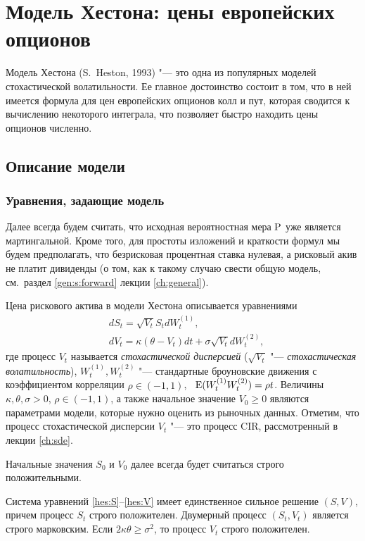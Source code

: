 
\chapter{Модель Хестона: цены европейских опционов}
\label{ch:heston-formula}
\chaptertoc

Модель Хестона (S.~Heston, 1993) "--- это одна из популярных моделей стохастической волатильности.
Ее главное достоинство состоит в том, что в ней имеется формула для цен европейских опционов колл и пут, которая сводится к вычислению некоторого интеграла, что позволяет быстро находить цены опционов численно.

\section{Описание модели}
\subsection{Уравнения, задающие модель}

Далее всегда будем считать, что исходная вероятностная мера $\P$ уже является мартингальной.
Кроме того, для простоты изложений и краткости формул мы будем предполагать, что безрисковая процентная ставка нулевая, а рисковый акив не платит дивиденды (о том, как к такому случаю свести общую модель, см.~раздел \ref{gen:s:forward} лекции \ref{ch:general}).

Цена рискового актива в модели Хестона описывается уравнениями
\begin{align}
\label{hes:S}
&dS_t = \sqrt{V_t}S_t d W_t^{(1)},\\
\label{hes:V}
&d V_t = \kappa(\theta-V_t)dt + \sigma\sqrt{V_t} d W_t^{(2)},
\end{align}
где процесс $V_t$ называется \emph{стохастической дисперсией} ($\sqrt{V_t}$ "--- \emph{стохастическая волатильность}), $W_t^{(1)},W_t^{(2)}$ "--- стандартные броуновские движения с коэффициентом корреляции $\rho\in(-1,1)$, \te\ $\E(W_t^{(1)}W_t^{(2)}) = \rho t$.
Величины $\kappa,\theta,\sigma>0$, $\rho\in(-1,1)$, а также начальное значение $V_0\ge 0$ являются параметрами модели, которые нужно оценить из рыночных данных.
Отметим, что процесс стохастической дисперсии $V_t$ "--- это процесс CIR, рассмотренный в лекции \ref{ch:sde}.

Начальные значения $S_0$ и $V_0$ далее всегда будет считаться строго положительными.

\begin{proposition}
Система уравнений \eqref{hes:S}--\eqref{hes:V} имеет единственное сильное решение $(S,V)$, причем процесс $S_t$ строго положителен.
Двумерный процесс $(S_t,V_t)$ является строго марковским.
Если $2\kappa\theta\ge \sigma^2$, то процесс $V_t$ строго положителен. 
\end{proposition}

